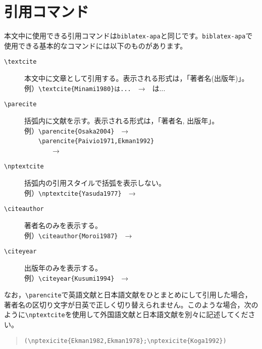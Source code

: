 \documentclass[12pt]{ltjsarticle}
\begin{document}
\section{引用コマンド}
本文中に使用できる引用コマンドは\texttt{biblatex-apa}と同じです。\texttt{biblatex-apa}で使用できる基本的なコマンドには以下のものがあります。

\begin{description}
  \item[\texttt{\textbackslash textcite}]
  本文中に文章として引用する。表示される形式は，「著者名(出版年)」。\\
  例）\texttt{\textbackslash textcite\{Minami1980\}は...}　→　\textcite{Minami1980}は...
  
  \item[\texttt{\textbackslash parecite}]
  括弧内に文献を示す。表示される形式は，「著者名, 出版年」。\\
  例）\texttt{\textbackslash parencite\{Osaka2004\}}　→　\parencite{Osaka2004}\\
  　　\texttt{\textbackslash parencite\{Paivio1971,Ekman1992\}}\\
  　　　　→　\parencite{Paivio1971,Ekman1992}

  \item[\texttt{\textbackslash nptextcite}]
  括弧内の引用スタイルで括弧を表示しない。\\
  例）\texttt{\textbackslash nptextcite\{Yasuda1977\}}　→　

  \item[\texttt{\textbackslash citeauthor}]
  著者名のみを表示する。\\
  例）\texttt{\textbackslash citeauthor\{Moroi1987\}}　→　\citeauthor{Moroi1987}

  \item[\texttt{\textbackslash citeyear}]
  出版年のみを表示する。\\
  例）\texttt{\textbackslash citeyear\{Kusumi1994\}}　→　\citeyear{Kusumi1994}
\end{description}

なお，\texttt{\textbackslash parencite}で英語文献と日本語文献をひとまとめにして引用した場合，著者名の区切り文字が日英で正しく切り替えられません。このような場合，次のように\texttt{\textbackslash nptextcite}を使用して外国語文献と日本語文献を別々に記述してください。

\begin{quote}
\begin{verbatim}
(\nptexicite{Ekman1982,Ekman1978};\nptexicite{Koga1992})
\end{verbatim}
\end{quote}
\end{document}
